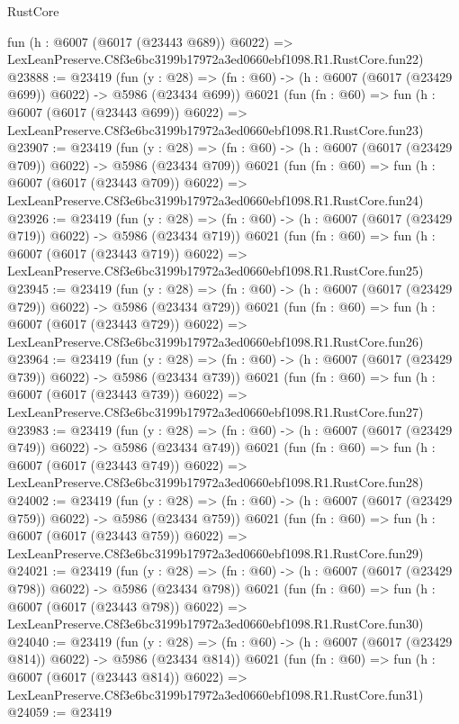 \begin{lexlean}{RustCore}
\begin{coremodule}
    fun (h : @6007 (@6017 (@23443 @689)) @6022) =>
    LexLeanPreserve.C8f3e6bc3199b17972a3ed0660ebf1098.R1.RustCore.fun22)
@23888 := @23419
    (fun (y : @28) => (fn : @60) -> (h : @6007 (@6017 (@23429 @699)) @6022) -> @5986 (@23434 @699))
    @6021
    (fun (fn : @60) =>
    fun (h : @6007 (@6017 (@23443 @699)) @6022) =>
    LexLeanPreserve.C8f3e6bc3199b17972a3ed0660ebf1098.R1.RustCore.fun23)
@23907 := @23419
    (fun (y : @28) => (fn : @60) -> (h : @6007 (@6017 (@23429 @709)) @6022) -> @5986 (@23434 @709))
    @6021
    (fun (fn : @60) =>
    fun (h : @6007 (@6017 (@23443 @709)) @6022) =>
    LexLeanPreserve.C8f3e6bc3199b17972a3ed0660ebf1098.R1.RustCore.fun24)
@23926 := @23419
    (fun (y : @28) => (fn : @60) -> (h : @6007 (@6017 (@23429 @719)) @6022) -> @5986 (@23434 @719))
    @6021
    (fun (fn : @60) =>
    fun (h : @6007 (@6017 (@23443 @719)) @6022) =>
    LexLeanPreserve.C8f3e6bc3199b17972a3ed0660ebf1098.R1.RustCore.fun25)
@23945 := @23419
    (fun (y : @28) => (fn : @60) -> (h : @6007 (@6017 (@23429 @729)) @6022) -> @5986 (@23434 @729))
    @6021
    (fun (fn : @60) =>
    fun (h : @6007 (@6017 (@23443 @729)) @6022) =>
    LexLeanPreserve.C8f3e6bc3199b17972a3ed0660ebf1098.R1.RustCore.fun26)
@23964 := @23419
    (fun (y : @28) => (fn : @60) -> (h : @6007 (@6017 (@23429 @739)) @6022) -> @5986 (@23434 @739))
    @6021
    (fun (fn : @60) =>
    fun (h : @6007 (@6017 (@23443 @739)) @6022) =>
    LexLeanPreserve.C8f3e6bc3199b17972a3ed0660ebf1098.R1.RustCore.fun27)
@23983 := @23419
    (fun (y : @28) => (fn : @60) -> (h : @6007 (@6017 (@23429 @749)) @6022) -> @5986 (@23434 @749))
    @6021
    (fun (fn : @60) =>
    fun (h : @6007 (@6017 (@23443 @749)) @6022) =>
    LexLeanPreserve.C8f3e6bc3199b17972a3ed0660ebf1098.R1.RustCore.fun28)
@24002 := @23419
    (fun (y : @28) => (fn : @60) -> (h : @6007 (@6017 (@23429 @759)) @6022) -> @5986 (@23434 @759))
    @6021
    (fun (fn : @60) =>
    fun (h : @6007 (@6017 (@23443 @759)) @6022) =>
    LexLeanPreserve.C8f3e6bc3199b17972a3ed0660ebf1098.R1.RustCore.fun29)
@24021 := @23419
    (fun (y : @28) => (fn : @60) -> (h : @6007 (@6017 (@23429 @798)) @6022) -> @5986 (@23434 @798))
    @6021
    (fun (fn : @60) =>
    fun (h : @6007 (@6017 (@23443 @798)) @6022) =>
    LexLeanPreserve.C8f3e6bc3199b17972a3ed0660ebf1098.R1.RustCore.fun30)
@24040 := @23419
    (fun (y : @28) => (fn : @60) -> (h : @6007 (@6017 (@23429 @814)) @6022) -> @5986 (@23434 @814))
    @6021
    (fun (fn : @60) =>
    fun (h : @6007 (@6017 (@23443 @814)) @6022) =>
    LexLeanPreserve.C8f3e6bc3199b17972a3ed0660ebf1098.R1.RustCore.fun31)
@24059 := @23419

\end{coremodule}
\end{lexlean}
